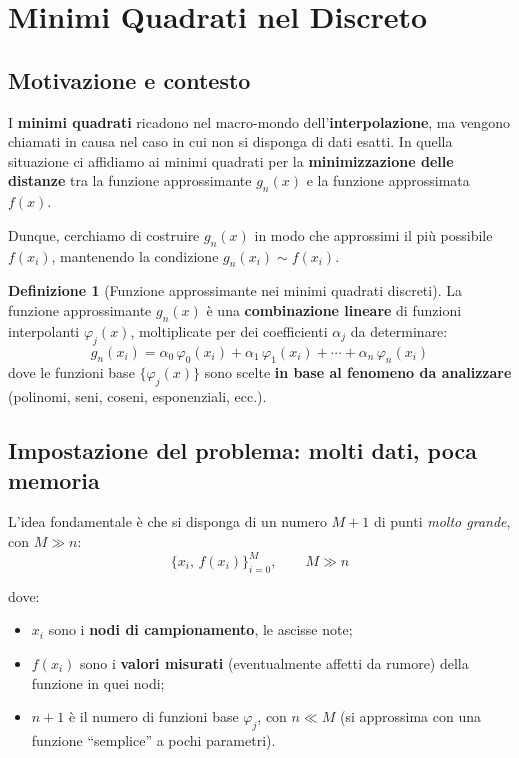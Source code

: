 \documentclass[a4paper,12pt]{article}
\theoremstyle{definition}
\newtheorem{definizione}{Definizione}[section]
\theoremstyle{remark}
\begin{document}
\section{Minimi Quadrati nel Discreto}

\subsection{Motivazione e contesto}

I \textbf{minimi quadrati} ricadono nel macro-mondo dell'\textbf{interpolazione},
ma vengono chiamati in causa nel caso in cui non si disponga di dati esatti.
In quella situazione ci affidiamo ai minimi quadrati per la
\textbf{minimizzazione delle distanze} tra la funzione approssimante $g_n(x)$
e la funzione approssimata $f(x)$.

Dunque, cerchiamo di costruire $g_n(x)$ in modo che approssimi
il più possibile $f(x_i)$, mantenendo la condizione
$g_n(x_i) \sim f(x_i)$.

\begin{definizione}[Funzione approssimante nei minimi quadrati discreti]
La funzione approssimante $g_n(x)$ è una \textbf{combinazione lineare}
di funzioni interpolanti $\varphi_j(x)$, moltiplicate per dei coefficienti
$\alpha_j$ da determinare:
\begin{equation}
  g_n(x_i) = \alpha_0\,\varphi_0(x_i) + \alpha_1\,\varphi_1(x_i)
             + \cdots + \alpha_n\,\varphi_n(x_i)
  \label{eq:gn-def}
\end{equation}
dove le funzioni base $\{\varphi_j(x)\}$ sono scelte \textbf{in base al
fenomeno da analizzare} (polinomi, seni, coseni, esponenziali, ecc.).
\end{definizione}

\subsection{Impostazione del problema: molti dati, poca memoria}

L'idea fondamentale è che si disponga di un numero $M+1$ di punti
\emph{molto grande}, con $M \gg n$:
\begin{equation}
  \{x_i,\, f(x_i)\}_{i=0}^{M}, \qquad M \gg n
  \label{eq:dati}
\end{equation}

\noindent dove:
\begin{itemize}
  \item $x_i$ sono i \textbf{nodi di campionamento}, le ascisse note;
  \item $f(x_i)$ sono i \textbf{valori misurati} (eventualmente affetti da
        rumore) della funzione in quei nodi;
  \item $n+1$ è il numero di funzioni base $\varphi_j$, con $n \ll M$
        (si approssima con una funzione ``semplice'' a pochi parametri).
\end{itemize}
\end{document}
